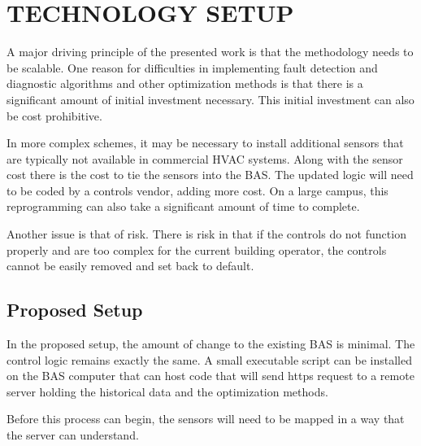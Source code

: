 \chapter{\uppercase{Technology Setup}}

A major driving principle of the presented work is that the methodology needs to be scalable. One reason for difficulties in implementing fault detection and diagnostic algorithms and other optimization methods is that there is a significant amount of initial investment necessary. This initial investment can also be cost prohibitive. 

In more complex schemes, it may be necessary to install additional sensors that are typically not available in commercial HVAC systems. Along with the sensor cost there is the cost to tie the sensors into the BAS. The updated logic will need to be coded by a controls vendor, adding more cost. On a large campus, this reprogramming can also take a significant amount of time to complete. 

Another issue is that of risk. There is risk in that if the controls do not function properly and are too complex for the current building operator, the controls cannot be easily removed and set back to default. 

\section{Proposed Setup}

In the proposed setup, the amount of change to the existing BAS is minimal. The control logic remains exactly the same. A small executable script can be installed on the BAS computer that can host code that will send https request to a remote server holding the historical data and the optimization methods. 

Before this process can begin, the sensors will need to be mapped in a way that the server can understand. 


